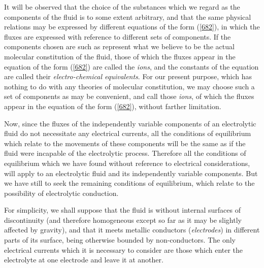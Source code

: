 \documentclass[12pt]{article}
\begin{document}
It will be observed that the choice of the substances which we regard as the components of the fluid is to some extent arbitrary, and that the same physical relations may be expressed by different equations of the form (\ref{682}), in which the fluxes are expressed with reference to different sets of components. If the components chosen are such as represent what we believe to be the actual molecular constitution of the fluid, those of which the fluxes appear in the equation of the form (\ref{682}) are called the \textit{ions}, and the constants of the equation are called their \textit{electro-chemical equivalents}. For our present purpose, which has nothing to do with any theories of molecular constitution, we may choose such a set of components as may be convenient, and call those \textit{ions}, of which the fluxes appear in the equation of the form (\ref{682}), without farther limitation.

Now, since the fluxes of the independently variable components of an electrolytic fluid do not necessitate any electrical currents, all the conditions of equilibrium which relate to the movements of these components will be the same as if the fluid were incapable of the electrolytic process. Therefore all the conditions of equilibrium which we have found without reference to electrical considerations, will apply to an electrolytic fluid and its independently variable components. But we have still to seek the remaining conditions of equilibrium, which relate to the possibility of electrolytic conduction.

For simplicity, we shall suppose that the fluid is without internal surfaces of discontinuity (and therefore homogeneous except so far as it may be slightly affected by gravity), and that it meets metallic conductors (\textit{electrodes}) in different parts of its surface, being otherwise bounded by non-conductors. The only electrical currents which it is necessary to consider are those which enter the electrolyte at one electrode and leave it at another.
\end{document}
